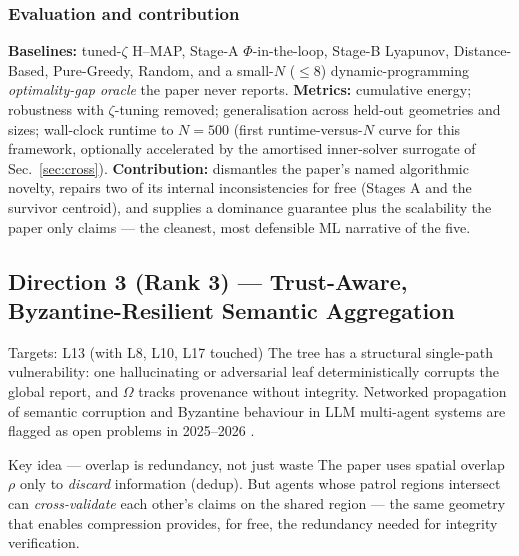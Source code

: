 \documentclass[11pt,a4paper]{article}
\begin{document}
\subsubsection{Evaluation and contribution}
\textbf{Baselines:} tuned-$\zeta$ H--MAP, Stage-A $\Phi$-in-the-loop, Stage-B Lyapunov, Distance-Based, Pure-Greedy, Random, and a small-$N$ ($\le 8$) dynamic-programming \emph{optimality-gap oracle} the paper never reports. \textbf{Metrics:} cumulative energy; robustness with $\zeta$-tuning removed; generalisation across held-out geometries and sizes; wall-clock runtime to $N{=}500$ (first runtime-versus-$N$ curve for this framework, optionally accelerated by the amortised inner-solver surrogate of Sec.~\ref{sec:cross}). \textbf{Contribution:} dismantles the paper's named algorithmic novelty, repairs two of its internal inconsistencies for free (Stages A and the survivor centroid), and supplies a dominance guarantee plus the scalability the paper only claims --- the cleanest, most defensible ML narrative of the five.

\subsection{Direction 3 (Rank 3) --- Trust-Aware, Byzantine-Resilient Semantic Aggregation}
\label{sec:d3}

\begin{limitbox}{Targets: L13 (with L8, L10, L17 touched)}
The tree has a structural single-path vulnerability: one hallucinating or adversarial leaf deterministically corrupts the global report, and $\Omega$ tracks provenance without integrity. Networked propagation of semantic corruption and Byzantine behaviour in LLM multi-agent systems are flagged as open problems in 2025--2026 \cite{securesemcom,sacbyz,decentllm,consensus}.
\end{limitbox}

\begin{ideabox}{Key idea --- overlap is redundancy, not just waste}
The paper uses spatial overlap $\rho$ only to \emph{discard} information (dedup). But agents whose patrol regions intersect can \emph{cross-validate} each other's claims on the shared region --- the same geometry that enables compression provides, for free, the redundancy needed for integrity verification.
\end{ideabox}
\end{document}
